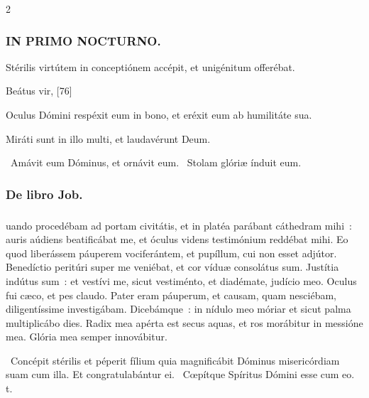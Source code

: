 \documentclass[9pt,twoside]{extarticle}
\begin{document}
\begin{multicols}{2}
{{{\subsubsection*{\center \textsc{IN PRIMO NOCTURNO.}}
\begin{tightlist}{}
\item {} Stérilis virtútem in conceptiónem accépit, et unigénitum offerébat.
\item {} Beátus vir,  [76]
\item {} Oculus Dómini respéxit eum in bono, et eréxit eum ab humilitáte sua.
\item {} Miráti sunt in illo multi, et laudavérunt Deum.
\item {}~Amávit eum Dóminus, et ornávit eum. ~Stolam glóriæ índuit eum.
\item {}
\end{tightlist}

\subsubsection*{\center De libro Job.}
\subsubsection*{\center {}}
uando procedébam ad portam civitátis, et in platéa parábant cáthedram mihi~: auris aúdiens beatificábat me, et óculus videns testimónium reddébat mihi. Eo quod liberássem páuperem vociferántem, et pupíllum, cui non esset adjútor. Benedíctio peritúri super me veniébat, et cor víduæ consolátus sum. Justítia indútus sum~: et vestívi me, sicut vestiménto, et diadémate, judício meo. Oculus fui cæco, et pes claudo. Pater eram páuperum, et causam, quam nesciébam, diligentíssime investigábam. Dicebámque~: in nídulo meo móriar et sicut palma multiplicábo dies. Radix mea apérta est secus aquas, et ros morábitur in messióne mea. Glória mea semper innovábitur.

\begin{tightlist}{}
\item {}~Concépit stérilis et péperit fílium quia magnificábit Dóminus misericórdiam suam cum illa. \textred{*} Et congratulabántur ei. ~Cœpítque Spíritus Dómini esse cum eo. t.
\end{tightlist}

}}}
\end{multicols}
\end{document}
